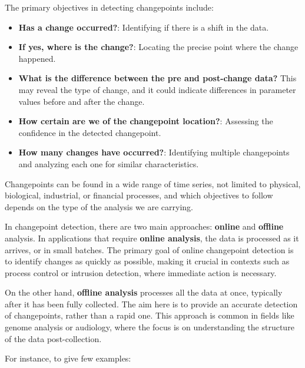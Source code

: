 \documentclass[
  letterpaper,
  DIV=11,
  numbers=noendperiod]{scrreprt}
\providecommand{\tightlist}{%
  \setlength{\itemsep}{0pt}\setlength{\parskip}{0pt}}\usepackage{longtable,booktabs,array}
\begin{document}
The primary objectives in detecting changepoints include:

\begin{itemize}
\tightlist
\item
  \textbf{Has a change occurred?}: Identifying if there is a shift in
  the data.
\item
  \textbf{If yes, where is the change?}: Locating the precise point
  where the change happened.
\item
  \textbf{What is the difference between the pre and post-change data?}
  This may reveal the type of change, and it could indicate differences
  in parameter values before and after the change.
\item
  \textbf{How certain are we of the changepoint location?}: Assessing
  the confidence in the detected changepoint.
\item
  \textbf{How many changes have occurred?}: Identifying multiple
  changepoints and analyzing each one for similar characteristics.
\end{itemize}

Changepoints can be found in a wide range of time series, not limited to
physical, biological, industrial, or financial processes, and which
objectives to follow depends on the type of the analysis we are
carrying.

In changepoint detection, there are two main approaches: \textbf{online}
and \textbf{offline} analysis. In applications that require
\textbf{online analysis}, the data is processed as it arrives, or in
small batches. The primary goal of online changepoint detection is to
identify changes as quickly as possible, making it crucial in contexts
such as process control or intrusion detection, where immediate action
is necessary.

On the other hand, \textbf{offline analysis} processes all the data at
once, typically after it has been fully collected. The aim here is to
provide an accurate detection of changepoints, rather than a rapid one.
This approach is common in fields like genome analysis or audiology,
where the focus is on understanding the structure of the data
post-collection.

For instance, to give few examples:
\end{document}
